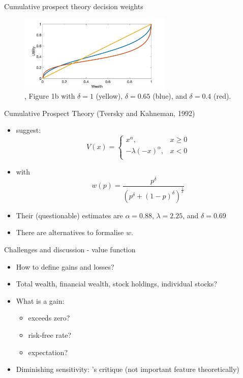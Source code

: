 \begin{frame}{Cumulative prospect theory decision weights}
    \begin{figure}
\centering
\includegraphics[width= 0.65\textwidth]{cpt_weights}
\caption{\citet{Barberis2012a}, Figure 1b with $\delta = 1$ (yellow), $\delta =0.65$ (blue), and $\delta =0.4$ (red).}
    \end{figure}
\end{frame}

\begin{frame}{Cumulative Prospect Theory (Tversky and Kahneman, 1992)}
    \begin{itemize}
        \item \citet{TverskyKahneman1992} suggest:
\begin{equation}
    V(x) = \begin{cases}
    x^\alpha,  & x\geq 0\\
    -\lambda (-x)^\alpha,  & x< 0\\
    \end{cases}
\end{equation}\medskip
\item with \[w(p) = \frac{p^{\delta}}{(p^{\delta}+(1-p)^{\delta})^{\frac{1}{\delta}}}\]
\item Their (questionable) estimates are $\alpha =0.88$, $\lambda =2.25$, and  $\delta =0.69$\medskip
    \item There are alternatives to formalise $w$.
\end{itemize}
\end{frame}

\begin{frame}{Challenges and discussion - value function}
    \begin{itemize}
        \item How to define gains and losses?\bigskip
        \item Total wealth, financial wealth, stock holdings, individual stocks?\bigskip
        \item What is a gain:\medskip
        \begin{itemize}
            \item exceeds zero?\medskip
            \item risk-free rate?\medskip
            \item expectation?\medskip
        \end{itemize}
                \item Diminishing sensitivity: \citet{Rabin2000}'s critique (not important feature theoretically)\medskip
        \end{itemize}
        \end{frame}

